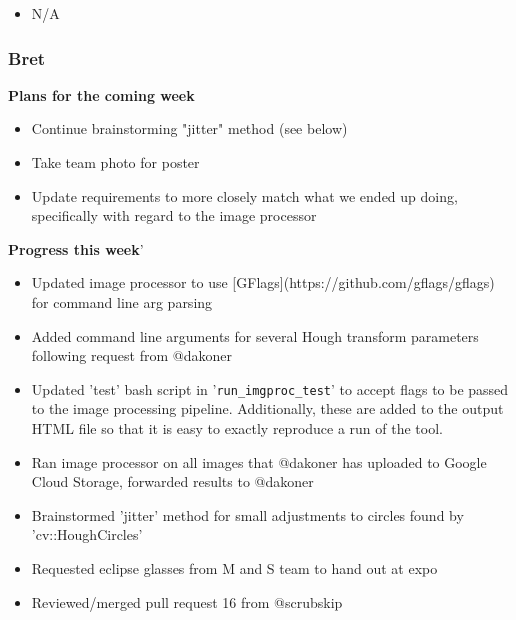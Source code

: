 \documentclass[10pt, onecolumn, draftclsnofoot, letterpaper, compsoc]{IEEEtran}
\begin{document}
    \begin{itemize}

    \item N/A

    \end{itemize}

    \subsubsection{Bret}

    \noindent \textbf{Plans for the coming week}

    \begin{itemize}

    \item Continue brainstorming "jitter" method (see below)
    \item Take team photo for poster
    \item Update requirements to more closely match what we ended up doing, specifically with regard to the image processor

    \end{itemize}

    \noindent \textbf{Progress this week}'

    \begin{itemize}

    \item Updated image processor to use [GFlags](https://github.com/gflags/gflags) for command line arg parsing
    \item Added command line arguments for several Hough transform parameters following request from @dakoner
    \item Updated 'test' bash script in '\texttt{run\_imgproc\_test}' to accept flags to be passed to the image processing pipeline. Additionally, these are added to the output HTML file so that it is easy to exactly reproduce a run of the tool.
    \item Ran image processor on all images that @dakoner has uploaded to Google Cloud Storage, forwarded results to @dakoner
    \item Brainstormed 'jitter' method for small adjustments to circles found by 'cv::HoughCircles'
    \item Requested eclipse glasses from M and S team to hand out at expo
    \item Reviewed/merged pull request 16 from @scrubskip

    \end{itemize}
\end{document}
